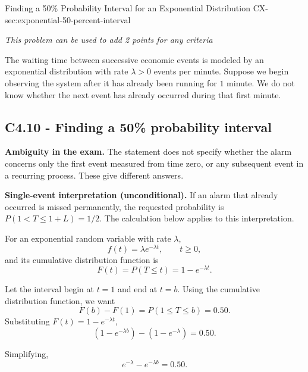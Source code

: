 	\sectionScored
	{Finding a 50\% Probability Interval for an Exponential Distribution}
	{CX-}
	{sec:exponential-50-percent-interval}
	{
		\begin{center}
				\textit{This problem can be used to add 2 points for any criteria}
			\end{center}
			The waiting time between successive economic events is modeled by an exponential distribution with rate $\lambda>0$ events per minute. Suppose we begin observing the system after it has already been running for $1$ minute. We do not know whether the next event has already occurred during that first minute.
		
		
		\label{subsec:c4-exponential-50-percent-interval}
		\subsection*{C4.10 - Finding a 50\% probability interval}

\textbf{Ambiguity in the exam.} The statement does not specify whether the
        alarm concerns only the first event measured from time zero, or any
        subsequent event in a recurring process. These give different answers.

        \textbf{Single-event interpretation (unconditional).} If an alarm that
        already occurred is missed permanently, the requested probability is
        \(P(1<T\leq1+L)=1/2\). The calculation below applies to this interpretation.
		
		For an exponential random variable with rate \(\lambda\),
		\[
		f(t)=\lambda e^{-\lambda t},
		\qquad t\geq0,
		\]
		and its cumulative distribution function is
		\[
		F(t)=P(T\leq t)=1-e^{-\lambda t}.
		\]
		
		Let the interval begin at \(t=1\) and end at \(t=b\). Using the cumulative distribution function, we want
		\[
		F(b)-F(1)=P(1\leq T\leq b)=0.50.
		\]
		Substituting \(F(t)=1-e^{-\lambda t}\),
		\[
		\left(1-e^{-\lambda b}\right)
		-\left(1-e^{-\lambda}\right)
		=0.50.
		\]
		
		Simplifying,
		\[
		e^{-\lambda}-e^{-\lambda b}=0.50.
		\]
		
}
